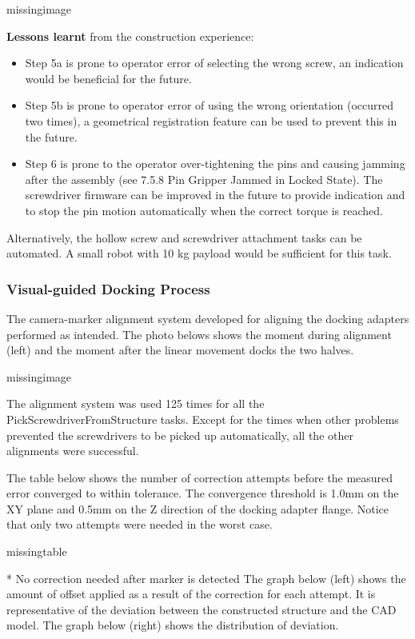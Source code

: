missingimage

\textbf{Lessons learnt }from the construction experience:
\begin{itemize}
    \item Step 5a is prone to operator error of selecting the wrong screw, an indication would be beneficial for the future.
    \item Step 5b is prone to operator error of using the wrong orientation (occurred two times), a geometrical registration feature can be used to prevent this in the future.
    \item Step 6 is prone to the operator over-tightening the pins and causing jamming after the assembly (see 7.5.8 Pin Gripper Jammed in Locked State). The screwdriver firmware can be improved in the future to provide indication and to stop the pin motion automatically when the correct torque is reached.
\end{itemize}

Alternatively, the hollow screw and screwdriver attachment tasks can be automated. A small robot with 10 kg payload would be sufficient for this task.

\subsubsection{Visual-guided Docking Process}
\label{subsubsection:exploration_4_visual_guided_docking_process}

The camera-marker alignment system developed for aligning the docking adapters performed as intended. The photo belows shows the moment during alignment (left) and the moment after the linear movement docks the two halves. 

missingimage

The alignment system was used 125 times for all the PickScrewdriverFromStructure tasks. Except for the times when other problems prevented the screwdrivers to be picked up automatically, all the other alignments were successful.

The table below shows the number of correction attempts before the measured error converged to within tolerance. The convergence threshold is 1.0mm on the XY plane and 0.5mm on the Z direction of the docking adapter flange. Notice that only two attempts were needed in the worst case.

missingtable

* No correction needed after marker is detected
The graph below (left) shows the amount of offset applied as a result of the correction for each attempt. It is representative of the deviation between the constructed structure and the CAD model. The graph below (right) shows the distribution of deviation.

